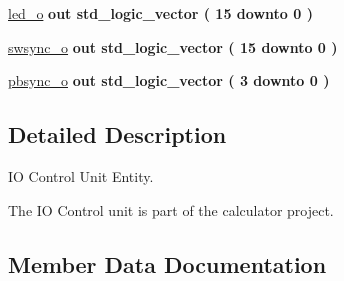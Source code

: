 \begin{DoxyCompactItemize}
\item 
\hyperlink{classio__ctrl_ae622b8b55ca985e4965d79aab895a746}{led\+\_\+o}  {\bfseries {\bfseries \textcolor{keywordflow}{out}\textcolor{vhdlchar}{ }}} {\bfseries \textcolor{comment}{std\+\_\+logic\+\_\+vector}\textcolor{vhdlchar}{ }\textcolor{vhdlchar}{(}\textcolor{vhdlchar}{ }\textcolor{vhdlchar}{ } \textcolor{vhdldigit}{15} \textcolor{vhdlchar}{ }\textcolor{keywordflow}{downto}\textcolor{vhdlchar}{ }\textcolor{vhdlchar}{ } \textcolor{vhdldigit}{0} \textcolor{vhdlchar}{ }\textcolor{vhdlchar}{)}\textcolor{vhdlchar}{ }} 
\item 
\hyperlink{classio__ctrl_a0d67cc1091d658566c78f05fa744f4a0}{swsync\+\_\+o}  {\bfseries {\bfseries \textcolor{keywordflow}{out}\textcolor{vhdlchar}{ }}} {\bfseries \textcolor{comment}{std\+\_\+logic\+\_\+vector}\textcolor{vhdlchar}{ }\textcolor{vhdlchar}{(}\textcolor{vhdlchar}{ }\textcolor{vhdlchar}{ } \textcolor{vhdldigit}{15} \textcolor{vhdlchar}{ }\textcolor{keywordflow}{downto}\textcolor{vhdlchar}{ }\textcolor{vhdlchar}{ } \textcolor{vhdldigit}{0} \textcolor{vhdlchar}{ }\textcolor{vhdlchar}{)}\textcolor{vhdlchar}{ }} 
\item 
\hyperlink{classio__ctrl_a95d4164acb4876609c3ee30095deba32}{pbsync\+\_\+o}  {\bfseries {\bfseries \textcolor{keywordflow}{out}\textcolor{vhdlchar}{ }}} {\bfseries \textcolor{comment}{std\+\_\+logic\+\_\+vector}\textcolor{vhdlchar}{ }\textcolor{vhdlchar}{(}\textcolor{vhdlchar}{ }\textcolor{vhdlchar}{ } \textcolor{vhdldigit}{3} \textcolor{vhdlchar}{ }\textcolor{keywordflow}{downto}\textcolor{vhdlchar}{ }\textcolor{vhdlchar}{ } \textcolor{vhdldigit}{0} \textcolor{vhdlchar}{ }\textcolor{vhdlchar}{)}\textcolor{vhdlchar}{ }} 
\end{DoxyCompactItemize}


\subsection{Detailed Description}
IO Control Unit Entity. 

The IO Control unit is part of the calculator project. 

\subsection{Member Data Documentation}
\mbox{\label{classio__ctrl_abe949478e3f8aad0a6aeb1842fa6c608}} 
